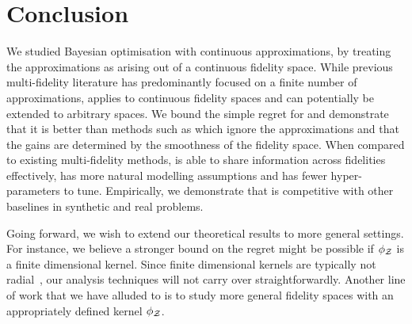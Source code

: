 

\vspace{-0.05in}
\section{Conclusion}
\label{sec:conclusion}
\vspace{-0.05in}

We studied Bayesian optimisation with continuous approximations, by treating the
approximations as arising out of a continuous fidelity space.
While previous multi-fidelity literature has predominantly focused on a finite number of
approximations, \bocas applies to continuous fidelity spaces and can potentially
be extended to arbitrary spaces.
We bound the simple regret for \bocas and demonstrate that it is better than methods such
as \gpucbs which ignore the approximations and that the gains are determined by the
smoothness of the fidelity space.
When compared to existing multi-fidelity methods, \bocas is able to share information
across fidelities
effectively, has more natural modelling assumptions and has fewer hyper-parameters to tune.
Empirically, we demonstrate that \bocas is competitive with other baselines in synthetic
and real problems.

Going forward, we wish to extend our theoretical results to more general settings.
For instance, we believe a stronger bound on the regret might be possible
if $\phi_{\mathcal{Z}}$ is a finite dimensional kernel.
Since finite dimensional kernels are typically not radial~\citep{sriperumbudur2016optimal},
our analysis techniques will not carry over straightforwardly.
Another line of work that we have alluded to is to study more general
fidelity spaces with an appropriately defined kernel $\phi_{\mathcal{Z}}$.

